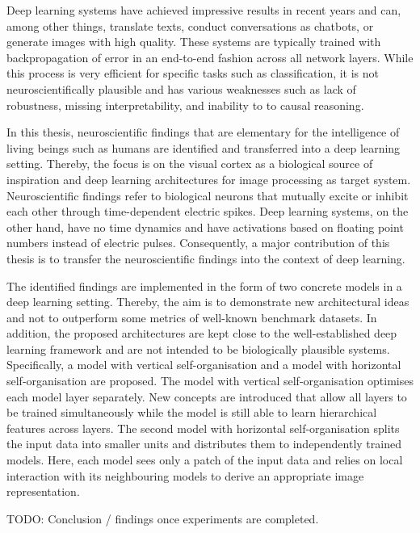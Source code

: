 Deep learning systems have achieved impressive results in recent years and can, among other things, translate texts, conduct conversations as chatbots, or generate images with high quality. These systems are typically trained with backpropagation of error in an end-to-end fashion across all network layers. While this process is very efficient for specific tasks such as classification, it is not neuroscientifically plausible and has various weaknesses such as lack of robustness, missing interpretability, and inability to to causal reasoning.

In this thesis, neuroscientific findings that are elementary for the intelligence of living beings such as humans are identified and transferred into a deep learning setting. Thereby, the focus is on the visual cortex as a biological source of inspiration and deep learning architectures for image processing as target system. Neuroscientific findings refer to biological neurons that mutually excite or inhibit each other through time-dependent electric spikes. Deep learning systems, on the other hand, have no time dynamics and have activations based on floating point numbers instead of electric pulses. Consequently, a major contribution of this thesis is to transfer the neuroscientific findings into the context of deep learning.

The identified findings are implemented in the form of two concrete models in a deep learning setting. Thereby, the aim is to demonstrate new architectural ideas and not to outperform some metrics of well-known benchmark datasets. In addition, the proposed architectures are kept close to the well-established deep learning framework and are not intended to be biologically plausible systems. Specifically, a model with vertical self-organisation and a model with horizontal self-organisation are proposed. The model with vertical self-organisation optimises each model layer separately. New concepts are introduced that allow all layers to be trained simultaneously while the model is still able to learn hierarchical features across layers. The second model with horizontal self-organisation splits the input data into smaller units and distributes them to independently trained models. Here, each model sees only a patch of the input data and relies on local interaction with its neighbouring models to derive an appropriate image representation.

TODO: Conclusion / findings once experiments are completed.